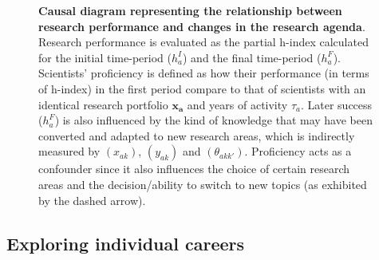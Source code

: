 \documentclass{article}
\begin{document}
\begin{figure}[h]
    \centering
    \caption{\textbf{Causal diagram representing the relationship between research performance and changes in the research agenda}. Research performance is evaluated as the partial h-index calculated for the initial time-period ($h_a^I$) and the final time-period ($h_a^F$). Scientists' proficiency is defined as how their performance (in terms of h-index) in the first period compare to that of scientists with an identical research portfolio $\bm{x_a}$ and years of activity $\tau_a$. Later success ($h_a^F$) is also influenced by the kind of knowledge that may have been converted and adapted to new research areas, which is indirectly measured by $(x_{ak})$, $(y_{ak})$ and $(\theta_{akk'})$. Proficiency acts as a confounder since it also influences the choice of certain research areas and the decision/ability to switch to new topics (as exhibited by the dashed arrow). }
    \label{fig:outcomes_causal_dag}
\end{figure}

\subsection{\label{appendix:cases}Exploring individual careers}
\end{document}
